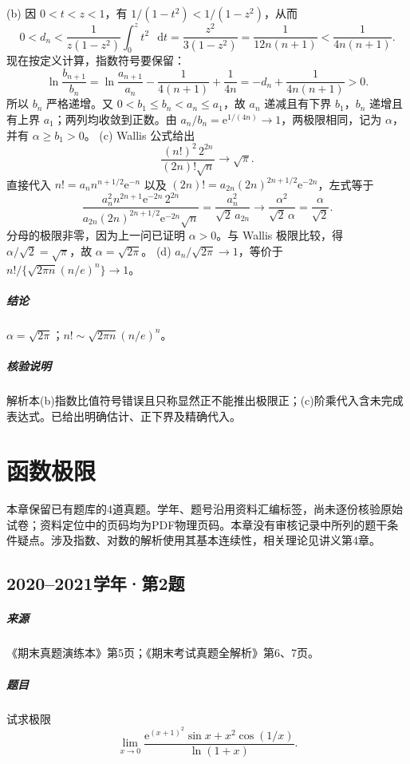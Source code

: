 \documentclass[UTF8,fontset=fandol,12pt,oneside,openany]{ctexrep}
\newcommand{\dd}{\mathop{}\!\mathrm d}
\newcommand{\ee}{\mathrm e}
\theoremstyle{definition}
\begin{document}
(b) 因 $0<t<z<1$，有 $1/(1-t^2)<1/(1-z^2)$，从而
\[
0<d_n<
\frac1{z(1-z^2)}\int_0^z t^2\,\dd t
=\frac{z^2}{3(1-z^2)}
=\frac1{12n(n+1)}<\frac1{4n(n+1)}.
\]
现在按定义计算，指数符号要保留：
\[
\ln\frac{b_{n+1}}{b_n}
=\ln\frac{a_{n+1}}{a_n}-\frac1{4(n+1)}+\frac1{4n}
=-d_n+\frac1{4n(n+1)}>0.
\]
所以 $b_n$ 严格递增。又 $0<b_1\le b_n<a_n\le a_1$，故 $a_n$ 递减且有下界 $b_1$，$b_n$ 递增且有上界 $a_1$；两列均收敛到正数。由 $a_n/b_n=\ee^{1/(4n)}\to1$，两极限相同，记为 $\alpha$，并有 $\alpha\ge b_1>0$。
(c) Wallis 公式给出
\[
\frac{(n!)^2\,2^{2n}}{(2n)!\sqrt n}\longrightarrow\sqrt\pi.
\]
直接代入 $n!=a_n n^{n+1/2}\ee^{-n}$ 以及 $(2n)!=a_{2n}(2n)^{2n+1/2}\ee^{-2n}$，左式等于
\[
\frac{a_n^2 n^{2n+1}\ee^{-2n}\,2^{2n}}
{a_{2n}(2n)^{2n+1/2}\ee^{-2n}\sqrt n}
=\frac{a_n^2}{\sqrt2\,a_{2n}}\longrightarrow\frac{\alpha^2}{\sqrt2\,\alpha}
=\frac{\alpha}{\sqrt2}.
\]
分母的极限非零，因为上一问已证明 $\alpha>0$。与 Wallis 极限比较，得 $\alpha/\sqrt2=\sqrt\pi$，故 $\alpha=\sqrt{2\pi}$。
(d) $a_n/\sqrt{2\pi}\to1$，等价于 $n!/\{\sqrt{2\pi n}(n/e)^n\}\to1$。

\paragraph{结论}
$\alpha=\sqrt{2\pi}$；$n!\sim\sqrt{2\pi n}(n/e)^n$。

\paragraph{核验说明}
解析本(b)指数比值符号错误且只称显然正不能推出极限正；(c)阶乘代入含未完成表达式。已给出明确估计、正下界及精确代入。


\chapter{函数极限}
\label{exam:03:chapter}
本章保留已有题库的4道真题。学年、题号沿用资料汇编标签，尚未逐份核验原始试卷；资料定位中的页码均为PDF物理页码。本章没有审核记录中所列的题干条件疑点。涉及指数、对数的解析使用其基本连续性，相关理论见讲义第4章。

\par\addvspace{18pt}\noindent\begin{minipage}{\linewidth}
\section{2020--2021学年·第2题}
\paragraph{来源}《期末真题演练本》第5页；《期末考试真题全解析》第6、7页。
\paragraph{题目}试求极限
\[
\lim_{x\to0}\frac{\ee^{(x+1)^2}\sin x+x^2\cos(1/x)}{\ln(1+x)}.
\]
\end{minipage}\par
\end{document}
